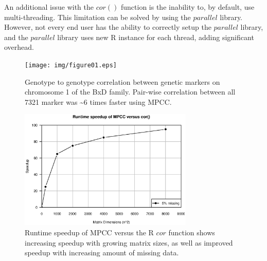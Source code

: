 \documentclass{bioinfo}
\begin{document}
An additional issue with the $cor()$ function is the inability to, by default, use 
multi-threading. This limitation can be solved by using the $parallel$ library. 
However, not every end user has the ability to correctly setup the $parallel$ 
library, and the $parallel$ library uses new R instance for each thread, adding 
significant overhead.
\vspace*{-5mm}
\begin{figure}[!t]
  \centerline{\texttt{[image: img/figure01.eps]}}
  \vspace*{-7mm}
  \caption{
    Genotype to genotype correlation between genetic markers on chromosome 
    1 of the BxD family. Pair-wise correlation between all 7321 marker was \textasciitilde{}6 times 
    faster using MPCC.
  }
  \label{fig:fig1}
  \vspace*{-5mm}
\end{figure}
\begin{figure}[!t]
  \centerline{\includegraphics[width=235pt]{img/figure02.eps}}
  \vspace*{-7mm}
  \caption{
    Runtime speedup of MPCC versus the R $cor$ function shows 
    increasing speedup with growing matrix sizes, as well as improved 
    speedup with increasing amount of missing data. 
  }
  \label{fig:fig2}
  \vspace*{-5mm}
\end{figure}
\end{document}
